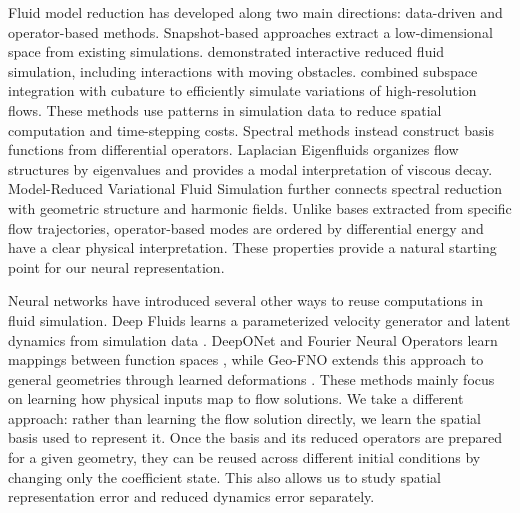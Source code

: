 Fluid model reduction has developed along two main directions: data-driven and operator-based methods. Snapshot-based approaches extract a low-dimensional space from existing simulations. \citet{treuille2006model} demonstrated interactive reduced fluid simulation, including interactions with moving obstacles. \citet{kim2013subspace} combined subspace integration with cubature to efficiently simulate variations of high-resolution flows. These methods use patterns in simulation data to reduce spatial computation and time-stepping costs. Spectral methods instead construct basis functions from differential operators. Laplacian Eigenfluids \citep{dewitt2012fluid} organizes flow structures by eigenvalues and provides a modal interpretation of viscous decay. Model-Reduced Variational Fluid Simulation \citep{liu2015model} further connects spectral reduction with geometric structure and harmonic fields. Unlike bases extracted from specific flow trajectories, operator-based modes are ordered by differential energy and have a clear physical interpretation. These properties provide a natural starting point for our neural representation.

Neural networks have introduced several other ways to reuse computations in fluid simulation. Deep Fluids learns a parameterized velocity generator and latent dynamics from simulation data \citep{kim2019deep}. DeepONet and Fourier Neural Operators learn mappings between function spaces \citep{lu2021deeponet,li2021fourier}, while Geo-FNO extends this approach to general geometries through learned deformations \citep{li2023geometry}. These methods mainly focus on learning how physical inputs map to flow solutions. We take a different approach: rather than learning the flow solution directly, we learn the spatial basis used to represent it. Once the basis and its reduced operators are prepared for a given geometry, they can be reused across different initial conditions by changing only the coefficient state. This also allows us to study spatial representation error and reduced dynamics error separately.

